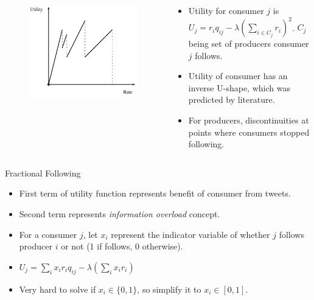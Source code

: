 \documentclass[aspectratio=169]{beamer}
\newcommand{\bi}{\begin{itemize}}
\newcommand{\ei}{\end{itemize}}
\begin{document}
\begin{frame}
\begin{columns}[T]
\begin{column}{0.2\textwidth}
\begin{figure}[!ht]
                \includegraphics[scale=0.1]{./figures/follow_celeb_utility.png}
            \end{figure}
        \end{column}
        \begin{column}{0.4\textwidth}
            \pause
            \bi
        \item Utility for consumer $j$ is $U_{j} = r_{i}q_{ij} - \lambda (\sum_{i
                \in C_{j}}r_{i})^2$. $C_j$ being set of producers consumer $j$ follows.
            \pause
        \item Utility of consumer has an inverse U-shape, which was predicted by
            literature.
            \pause
        \item For producers, discontinuities at points where consumers stopped
            following.
            \ei
        \end{column}
    \end{columns}
\end{frame}

\begin{frame}{Fractional Following}
    \bi
\item First term of utility function represents benefit of consumer from tweets.
    \pause
\item Second term represents \textit{information overload} concept.
    \pause
\item For a consumer $j$, let $x_i$ represent the indicator variable of whether
    $j$ follows producer $i$ or not (1 if follows, 0 otherwise).
    \pause
\item $U_j = \sum_{i}x_i r_i q_{ij} - \lambda (\sum_{i}x_i r_i)$
    \pause
\item Very hard to solve if $x_i \in \{0, 1\}$, so simplify it to $x_i \in [0,1]$.
    \ei
\end{frame}
\end{document}
